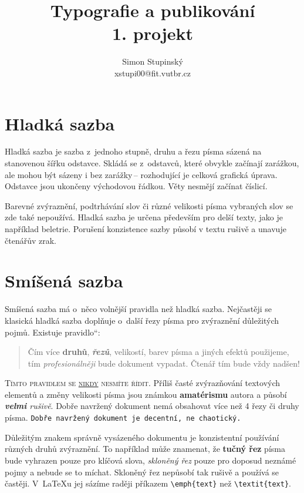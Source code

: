 \documentclass[11pt, a4paper, twocolumn]{article}
\title{Typografie a publikování\\1. projekt }
\author{Simon Stupinský\\xstupi00@fit.vutbr.cz}
\date{}
\begin{document}
\maketitle

\providecommand{\myuv}[1]{\quotedblbase #1\textquotedblleft}

\section{Hladká sazba}
Hladká sazba je sazba z~jednoho stupně, druhu a řezu písma sázená na stanovenou šířku odstavce. Skládá se z~odstavců, které obvykle začínají zarážkou, ale mohou být sázeny i bez zarážky\,-- rozhodující je celková grafická úprava. Odstavce jsou ukončeny východovou řádkou. Věty nesmějí začínat číslicí.

Barevné zvýraznění, podtrhávání slov či různé velikosti písma vybraných slov se zde také nepoužívá. Hladká sazba je určena především pro delší texty, jako je například beletrie. Porušení konzistence sazby působí v textu rušivě a unavuje čtenářův zrak.

\section{Smíšená sazba}
Smíšená sazba má o~něco volnější pravidla než hladká sazba. Nejčastěji se klasická hladká sazba doplňuje o~další řezy písma pro zvýraznění důležitých pojmů. Existuje \myuv{pravidlo}:

\begin{quotation}
Čím více \textbf{druhů}, \emph{\textbf{řezů}}, \textup{\scriptsize{velikostí}},  barev pí\-sma a jiných efektů použijeme, tím \emph{profesionálněji} bude dokument vypadat. Čtenář tím bude vždy \textmd{\Huge{nadšen!}}
\end{quotation}

\textsc{Tímto pravidlem se \underline{nikdy} nesmíte řídit.} Příliš časté zvýrazňování textových elementů a změny velikosti {\tiny písma} jsou {\LARGE známkou} \textbf{\huge{a\-ma\-té\-ris\-mu}} autora a působí \emph{\textbf{velmi} rušivě}. Dobře navr\-že\-ný dokument nemá obsahovat více než 4 řezy či druhy písma. \texttt{Dobře navržený dokument je decentní, ne chaotický.}

Důležitým znakem správně vysázeného dokumentu je konzistentní používání různých druhů zvýraznění. To například může znamenat, že \textbf{tučný řez} písma bude vyhrazen pouze pro klíčová slova, \emph{skloněný řez} pouze pro doposud neznámé pojmy a nebude se to míchat. Skloněný řez nepůsobí tak rušivě a používá se častěji. V~\LaTeX u jej sázíme
raději příkazem \verb|\emph{text}| než \verb|\textit{text}|.
\end{document}
